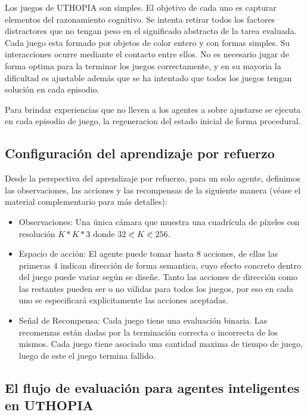 Los juegos de UTHOPIA son simples. El objetivo de cada uno es capturar elementos del razonamiento cognitivo. Se intenta retirar todos los factores distractores que no tengan peso en el significado abstracto de la tarea evaluada. Cada juego esta formado por objetos de color entero y con formas simples. Su interacciones ocurre mediante el contacto entre ellos. No es necesario jugar de forma optima para la terminar los juegos correctamente, y en su mayoria la dificultad es ajustable además que se ha intentado que todos los juegos tengan solución en cada episodio. 

Para brindar experiencias que no lleven a los agentes a sobre ajustarse se ejecuta en cada episodio de juego, la regeneracion del estado inicial de forma procedural.

\subsection{Configuración del aprendizaje por refuerzo}

Desde la perspectiva del aprendizaje por refuerzo, para un solo agente, definimos las observaciones, las acciones y las recompensas de la siguiente manera (véase el material complementario para más detalles):

\begin{itemize}
    \item Observaciones: Una única cámara que muestra una cuadrícula de píxeles con resolución $K * K * 3$ donde $32 \eqslantless K \eqslantless 256$.
    \item Espacio de acción: El agente puede tomar hasta $8$ acciones, de ellas las primeras $4$ indican dirección de forma semantica, cuyo efecto concreto dentro del juego puede variar según se diseñe. Tanto las acciones de dirección como las restantes pueden ser o no válidas para todos los juegos, por eso en cada uno se especificará explicitamente las acciones aceptadas.
    \item Señal de Recompensa: Cada juego tiene una evaluación binaria. Las recomenzas están dadas por la terminación correcta o incorrecta de los mismos. Cada juego tiene asociado una cantidad maxima de tiempo de juego, luego de este el juego termina fallido.
\end{itemize} 


\subsection{El flujo de evaluación para agentes inteligentes en UTHOPIA}

